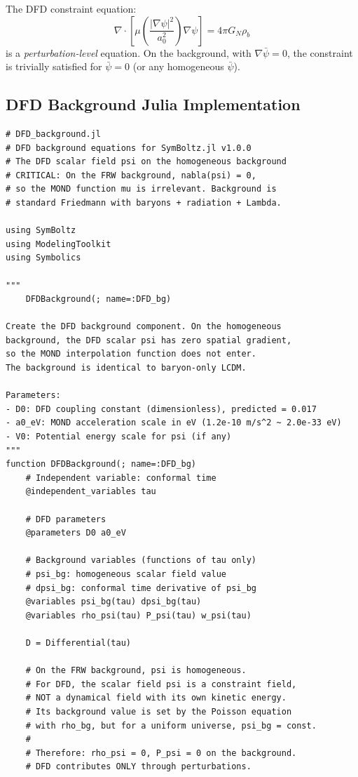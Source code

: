 \documentclass[11pt,a4paper]{article}
\begin{document}
The DFD constraint equation:
\begin{equation}
\nabla\cdot\left[\mu\!\left(\frac{|\nabla\psi|^2}{a_0^2}\right)\nabla\psi\right] = 4\pi G_N\rho_b
\label{eq:constraint}
\end{equation}
is a \emph{perturbation-level} equation. On the background, with $\nabla\bar{\psi} = 0$, the constraint is trivially satisfied for $\bar{\psi} = 0$ (or any homogeneous $\bar{\psi}$).

\subsection{DFD Background Julia Implementation}

\begin{lstlisting}[caption={DFD background component for SymBoltz.jl},label={lst:bg}]
# DFD_background.jl
# DFD background equations for SymBoltz.jl v1.0.0
# The DFD scalar field psi on the homogeneous background
# CRITICAL: On the FRW background, nabla(psi) = 0,
# so the MOND function mu is irrelevant. Background is
# standard Friedmann with baryons + radiation + Lambda.

using SymBoltz
using ModelingToolkit
using Symbolics

"""
    DFDBackground(; name=:DFD_bg)

Create the DFD background component. On the homogeneous
background, the DFD scalar psi has zero spatial gradient,
so the MOND interpolation function does not enter.
The background is identical to baryon-only LCDM.

Parameters:
- D0: DFD coupling constant (dimensionless), predicted = 0.017
- a0_eV: MOND acceleration scale in eV (1.2e-10 m/s^2 ~ 2.0e-33 eV)
- V0: Potential energy scale for psi (if any)
"""
function DFDBackground(; name=:DFD_bg)
    # Independent variable: conformal time
    @independent_variables tau

    # DFD parameters
    @parameters D0 a0_eV

    # Background variables (functions of tau only)
    # psi_bg: homogeneous scalar field value
    # dpsi_bg: conformal time derivative of psi_bg
    @variables psi_bg(tau) dpsi_bg(tau)
    @variables rho_psi(tau) P_psi(tau) w_psi(tau)

    D = Differential(tau)

    # On the FRW background, psi is homogeneous.
    # For DFD, the scalar field psi is a constraint field,
    # NOT a dynamical field with its own kinetic energy.
    # Its background value is set by the Poisson equation
    # with rho_bg, but for a uniform universe, psi_bg = const.
    #
    # Therefore: rho_psi = 0, P_psi = 0 on the background.
    # DFD contributes ONLY through perturbations.


\end{lstlisting}
\end{document}
